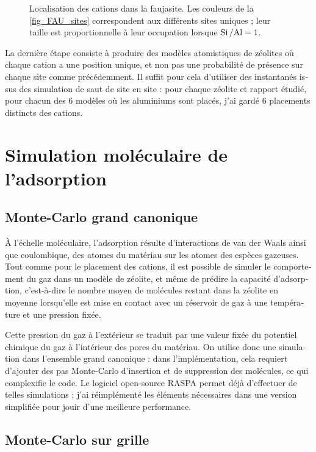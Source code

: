 \documentclass[thesis]{subfiles}
\begin{document}
\begin{otherlanguage}{french}
\begin{figure}[ht]
	\caption{Localisation des cations dans la faujasite. Les couleurs de la \cref{fig_FAU_sites} correspondent aux différents sites uniques ; leur taille est proportionnelle à leur occupation lorsque $\mbox{Si\,/Al} = 1$.}\label{fig_FAU}
\end{figure}

La dernière étape consiste à produire des modèles atomistiques de zéolites où chaque cation a une position unique, et non pas une probabilité de présence sur chaque site comme précédemment. Il suffit pour cela d'utiliser des instantanés issus des simulation de saut de site en site : pour chaque zéolite et rapport \SiAl étudié, pour chacun des 6 modèles où les aluminiums sont placés, j'ai gardé 6 placements distincts des cations.


\section{Simulation moléculaire de l'adsorption}

\subsection{Monte-Carlo grand canonique}

À l'échelle moléculaire, l'adsorption résulte d'interactions de van der Waals ainsi que coulombique, des atomes du matériau sur les atomes des espèces gazeuses. Tout comme pour le placement des cations, il est possible de simuler le comportement du gaz dans un modèle de zéolite, et même de prédire la capacité d'adsorption, c'est-à-dire le nombre moyen de molécules restant dans la zéolite en moyenne lorsqu'elle est mise en contact avec un réservoir de gaz à une température et une pression fixée.

Cette pression du gaz à l'extérieur se traduit par une valeur fixée du potentiel chimique du gaz à l'intérieur des pores du matériau. On utilise donc une simulation dans l'ensemble grand canonique : dans l'implémentation, cela requiert d'ajouter des pas Monte-Carlo d'insertion et de suppression des molécules, ce qui complexifie le code. Le logiciel open-source RASPA \autocite{RASPA} permet déjà d'effectuer de telles simulations ; j'ai réimplémenté les éléments nécessaires dans une version simplifiée pour jouir d'une meilleure performance.

\subsection{Monte-Carlo sur grille}


\end{otherlanguage}
\end{document}
